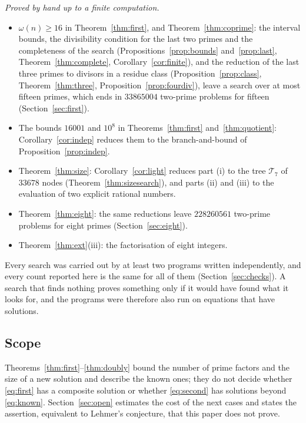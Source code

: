 \documentclass[screen,reqno]{aomart}
\numberwithin{equation}{section}
\theoremstyle{plain}
\theoremstyle{definition}
\theoremstyle{remark}
\begin{document}
\emph{Proved by hand up to a finite computation.}
\begin{itemize}[leftmargin=*]
\item $\omega(n)\ge16$ in Theorem~\ref{thm:first}, and
Theorem~\ref{thm:coprime}: the interval bounds, the divisibility
condition for the last two primes and the completeness of the search
(Propositions~\ref{prop:bounds} and~\ref{prop:last},
Theorem~\ref{thm:complete}, Corollary~\ref{cor:finite}), and the
reduction of the last three primes to divisors in a residue class
(Proposition~\ref{prop:class}, Theorem~\ref{thm:three},
Proposition~\ref{prop:fourdiv}), leave a search over at most fifteen
primes, which ends in $33865004$ two-prime problems for fifteen
(Section~\ref{sec:first}).
\item The bounds $16001$ and $10^8$ in Theorems~\ref{thm:first}
and~\ref{thm:quotient}: Corollary~\ref{cor:indep} reduces them to the
branch-and-bound of Proposition~\ref{prop:indep}.
\item Theorem~\ref{thm:size}: Corollary~\ref{cor:light} reduces part
(i) to the tree $\mathcal T_7$ of $33678$ nodes
(Theorem~\ref{thm:sizesearch}), and parts (ii) and (iii) to the
evaluation of two explicit rational numbers.
\item Theorem~\ref{thm:eight}: the same reductions leave $228260561$
two-prime problems for eight primes (Section~\ref{sec:eight}).
\item Theorem~\ref{thm:ext}(iii): the factorisation of eight integers.
\end{itemize}
Every search was carried out by at least two programs written
independently, and every count reported here is the same for all of
them (Section~\ref{sec:checks}). A search
that finds nothing proves something only if it would have found what it
looks for, and the programs were therefore also run on equations that
have solutions.

\subsection{Scope}
Theorems~\ref{thm:first}--\ref{thm:doubly} bound the number of prime
factors and the size of a new solution and describe the known ones; they do not
decide whether \eqref{eq:first} has a composite solution or whether
\eqref{eq:second} has solutions beyond \eqref{eq:known}.
Section~\ref{sec:open} estimates the cost of the next cases and states
the assertion, equivalent to Lehmer's conjecture, that this paper does
not prove.
\end{document}
